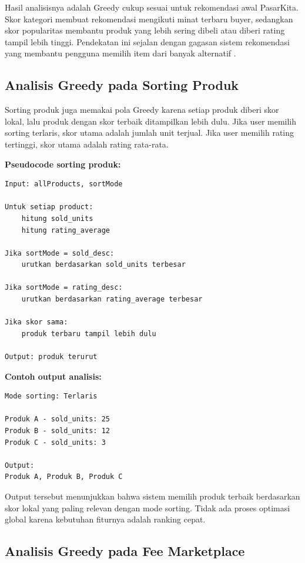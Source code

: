 Hasil analisisnya adalah Greedy cukup sesuai untuk rekomendasi awal PasarKita. Skor kategori membuat rekomendasi mengikuti minat terbaru buyer, sedangkan skor popularitas membantu produk yang lebih sering dibeli atau diberi rating tampil lebih tinggi. Pendekatan ini sejalan dengan gagasan sistem rekomendasi yang membantu pengguna memilih item dari banyak alternatif \parencite{Resnick1997}.

\subsection{Analisis Greedy pada Sorting Produk}

Sorting produk juga memakai pola Greedy karena setiap produk diberi skor lokal, lalu produk dengan skor terbaik ditampilkan lebih dulu. Jika user memilih sorting terlaris, skor utama adalah jumlah unit terjual. Jika user memilih rating tertinggi, skor utama adalah rating rata-rata.

\textbf{Pseudocode sorting produk:}

\begin{Verbatim}[frame=single,framesep=6pt,fontsize=\scriptsize]
Input: allProducts, sortMode

Untuk setiap product:
    hitung sold_units
    hitung rating_average

Jika sortMode = sold_desc:
    urutkan berdasarkan sold_units terbesar

Jika sortMode = rating_desc:
    urutkan berdasarkan rating_average terbesar

Jika skor sama:
    produk terbaru tampil lebih dulu

Output: produk terurut
\end{Verbatim}

\newpage
\textbf{Contoh output analisis:}

\begin{Verbatim}[frame=single,framesep=6pt,fontsize=\scriptsize]
Mode sorting: Terlaris

Produk A - sold_units: 25
Produk B - sold_units: 12
Produk C - sold_units: 3

Output:
Produk A, Produk B, Produk C
\end{Verbatim}

Output tersebut menunjukkan bahwa sistem memilih produk terbaik berdasarkan skor lokal yang paling relevan dengan mode sorting. Tidak ada proses optimasi global karena kebutuhan fiturnya adalah ranking cepat.

\subsection{Analisis Greedy pada Fee Marketplace}

